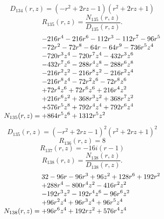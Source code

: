 \documentclass[11pt,a4paper]{article}
\begin{document}
\begin{equation}
D_{134}(r,z)=\left(- r^{2} + 2 r z - 1\right) \left(r^{2} + 2 r z + 1\right)
\label{eq:cat-denominator-134}
\end{equation}
\begin{equation}
R_{135}(r,z)=\frac{N_{135}(r,z)}{D_{135}(r,z)}.
\label{eq:cat-rational-135}
\end{equation}
\begin{equation}
N_{135}(r,z)=\shortstack[l]{$\displaystyle  - 216 r^{4} - 216 r^{6} - 112 r^{3} - 112 r^{7} - 96 r^{5}$\\
$\displaystyle  - 72 r^{2} - 72 r^{8} - 64 r - 64 r^{9} - 736 r^{5} z^{4}$\\
$\displaystyle  - 720 r^{3} z^{4} - 720 r^{7} z^{4} - 432 r^{3} z^{6}$\\
$\displaystyle  - 432 r^{7} z^{6} - 288 r^{4} z^{8} - 288 r^{6} z^{8}$\\
$\displaystyle  - 216 r^{2} z^{2} - 216 r^{8} z^{2} - 216 r^{2} z^{4}$\\
$\displaystyle  - 216 r^{8} z^{4} - 72 r^{2} z^{6} - 72 r^{8} z^{6}$\\
$\displaystyle  + 72 r^{4} z^{6} + 72 r^{6} z^{6} + 216 r^{4} z^{2}$\\
$\displaystyle  + 216 r^{6} z^{2} + 368 r^{3} z^{2} + 368 r^{7} z^{2}$\\
$\displaystyle  + 576 r^{5} z^{8} + 792 r^{4} z^{4} + 792 r^{6} z^{4}$\\
$\displaystyle  + 864 r^{5} z^{6} + 1312 r^{5} z^{2}$}
\label{eq:cat-numerator-135}
\end{equation}
\begin{equation}
D_{135}(r,z)=\left(- r^{2} + 2 r z - 1\right)^{2} \left(r^{2} + 2 r z + 1\right)^{2}
\label{eq:cat-denominator-135}
\end{equation}
\begin{equation}
R_{136}(r,z)=8
\label{eq:cat-rational-136}
\end{equation}
\begin{equation}
R_{137}(r,z)=- 16 i \left(r - 1\right)
\label{eq:cat-rational-137}
\end{equation}
\begin{equation}
R_{138}(r,z)=\frac{N_{138}(r,z)}{D_{138}(r,z)}.
\label{eq:cat-rational-138}
\end{equation}
\begin{equation}
N_{138}(r,z)=\shortstack[l]{$\displaystyle 32 - 96 r - 96 r^{3} + 96 z^{2} + 128 r^{6} + 192 r^{2}$\\
$\displaystyle  + 288 r^{4} - 800 r^{4} z^{2} - 416 r^{2} z^{2}$\\
$\displaystyle  - 192 r^{3} z^{2} - 192 r^{4} z^{6} - 96 r^{6} z^{2}$\\
$\displaystyle  + 96 r^{2} z^{4} + 96 r^{3} z^{4} + 96 r^{5} z^{4}$\\
$\displaystyle  + 96 r^{6} z^{4} + 192 r z^{2} + 576 r^{4} z^{4}$}
\label{eq:cat-numerator-138}
\end{equation}
\end{document}
